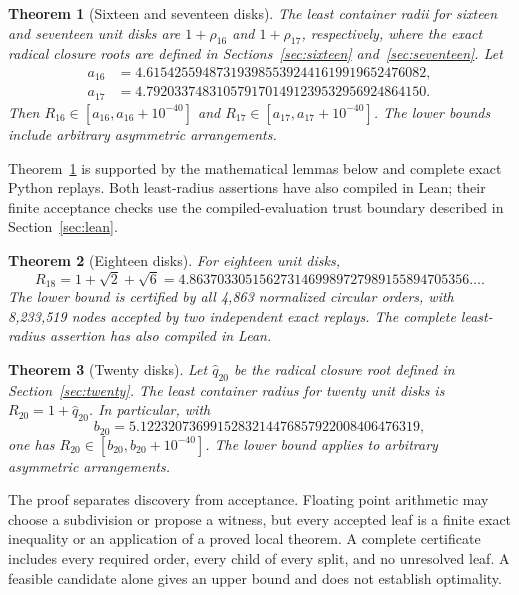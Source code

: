 \documentclass[11pt]{amsart}
\newtheorem{theorem}{Theorem}[section]
\theoremstyle{definition}
\theoremstyle{remark}
\newcommand{\rhoSixteen}{\rho_{16}}
\newcommand{\rhoSeventeen}{\rho_{17}}
\begin{document}
\begin{theorem}[Sixteen and seventeen disks]\label{thm:completed}
The least container radii for sixteen and seventeen unit disks are
$1+\rhoSixteen$ and $1+\rhoSeventeen$, respectively, where the exact radical
closure roots are defined in Sections~\ref{sec:sixteen} and~\ref{sec:seventeen}.
Let
\begin{align*}
a_{16}&=4.6154255948731939855392441619919652476082,\\
a_{17}&=4.7920337483105791701491239532956924864150.
\end{align*}
Then $R_{16}\in[a_{16},a_{16}+10^{-40}]$ and
$R_{17}\in[a_{17},a_{17}+10^{-40}]$.
The lower bounds include arbitrary asymmetric arrangements.
\end{theorem}
\noindent Theorem~\ref{thm:completed} is supported by the mathematical lemmas
below and complete exact Python replays. Both least-radius assertions
have also compiled in Lean; their finite acceptance checks use the
compiled-evaluation trust boundary described in Section~\ref{sec:lean}.

\begin{theorem}[Eighteen disks]\label{thm:eighteen}
For eighteen unit disks,
\[
 R_{18}=1+\sqrt2+\sqrt6
 =4.8637033051562731469989727989155894705356\ldots.
\]
The lower bound is certified by all 4,863 normalized circular orders,
with 8,233,519 nodes accepted by two independent exact replays.
The complete least-radius assertion has also compiled in Lean.
\end{theorem}
\begin{theorem}[Twenty disks]\label{thm:twenty}
Let $\widehat q_{20}$ be the radical closure root defined in
Section~\ref{sec:twenty}. The least container radius for twenty unit disks is
$R_{20}=1+\widehat q_{20}$. In particular, with
\[
 b_{20}=5.1223207369915283214476857922008406476319,
\]
one has $R_{20}\in[b_{20},b_{20}+10^{-40}]$.
The lower bound applies to arbitrary asymmetric arrangements.
\end{theorem}

The proof separates discovery from acceptance. Floating point arithmetic may
choose a subdivision or propose a witness, but every accepted leaf is a
finite exact inequality or an application of a proved local theorem. A
complete certificate includes every required order, every child of every
split, and no unresolved leaf. A feasible candidate alone gives an upper
bound and does not establish optimality.
\end{document}
